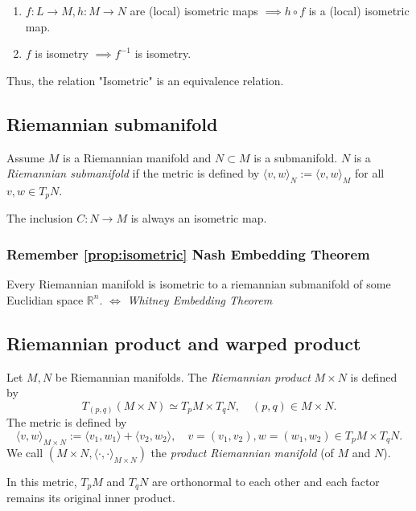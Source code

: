 \begin{proposition}
\begin{enumerate}[label=(\arabic*)]
\item $f: L \to M, h : M \to N$ are (local) isometric maps $\implies h \circ f$ is a (local) isometric map.
\item $f$ is isometry $\implies f^{-1}$ is isometry.
\end{enumerate}
Thus, the relation "Isometric" is an equivalence relation.
\label{prop:isometric}
\end{proposition}

\subsection{Riemannian submanifold}

\begin{definition}
Assume $M$ is a Riemannian manifold and $N \subset M$ is a submanifold.
$N$ is a \emph{Riemannian submanifold} if the metric is defined by $\langle v, w \rangle_N := \langle v, w \rangle_M$ for all $v, w \in T_pN$.
\end{definition}

The inclusion $C : N \to M$ is always an isometric map.

\subsubsection{Remember \autoref{prop:isometric} Nash Embedding Theorem}
Every Riemannian manifold is isometric to a riemannian submanifold of some Euclidian space $\mathbb{R}^n$. $\Leftrightarrow$
\emph{Whitney Embedding Theorem}

\subsection{Riemannian product and warped product}

\begin{definition}
Let $M, N$ be Riemannian manifolds. The \emph{Riemannian product} $M \times N$ is defined by
\[
T_{(p,q)} (M \times N) \simeq T_p M \times T_q N, \quad (p,q) \in M \times N.
\]
The metric is defined by
\[
\langle v, w \rangle_{M \times N} := \langle v_1, w_1\rangle + \langle v_2, w_2 \rangle, \quad v = (v_1, v_2), w = (w_1, w_2) \in T_pM \times T_qN.
\]
We call $(M\times N, \langle \cdot, \cdot \rangle_{M \times N})$ the \emph{product Riemannian manifold} (of $M$ and $N$).

In this metric, $T_pM$ and $T_qN$ are orthonormal to each other and each factor remains its original inner product.
\end{definition}

